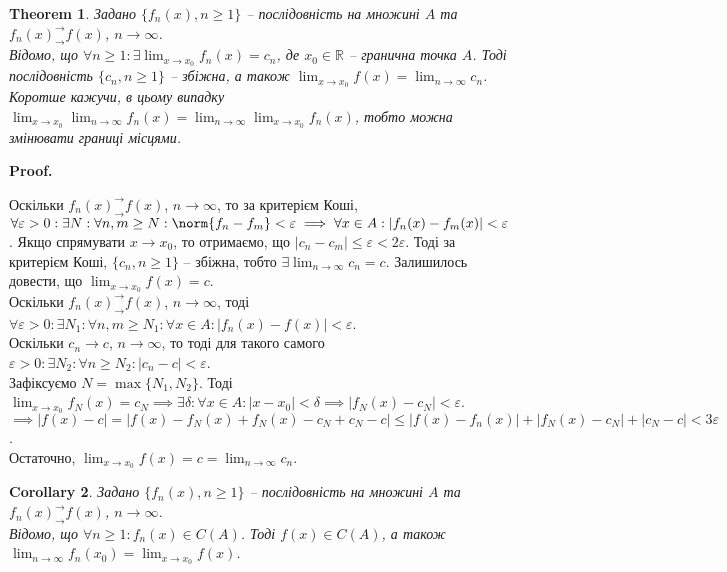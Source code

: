 \documentclass[a4paper, 10pt]{article}
\makeatletter
\def\huge{\displaystyle}
\def\qed{$\blacksquare$}
\theoremstyle{theoremdd}
\newtheorem{theorem}{Theorem}[subsection]
\theoremstyle{theoremdd}
\theoremstyle{theoremdd}
\theoremstyle{theoremdd}
\theoremstyle{theoremdd}
\theoremstyle{theoremdd}
\theoremstyle{theoremdd}
\theoremstyle{theoremdd}
\theoremstyle{theoremdd}
\newtheorem{corollary}[theorem]{Corollary}
\renewenvironment{proof}[1][Proof.\\]{\par
\pushQED{\hfill \qed}%
\normalfont \topsep6\p@\@plus6\p@\relax
\trivlist
\item\relax
{\bfseries
#1\@addpunct{.}}\hspace\labelsep\ignorespaces
}{%
\popQED\endtrivlist\@endpefalse
}
\makeatother
\begin{document}
\begin{theorem}
Задано $\{f_n(x), n \geq 1\}$ -- послідовність на множині $A$ та $f_n(x)^\rightarrow_\rightarrow f(x)$, $n \to \infty$.\\
Відомо, що $\forall n \geq 1: \exists\huge\lim_{x \to x_0} f_n(x) = c_n$, де $x_0 \in \mathbb{R}$ -- гранична точка $A$. Тоді послідовність $\{c_n, n \geq 1\}$ -- збіжна, а також $\huge\lim_{x \to x_0} f(x) = \lim_{n \to \infty} c_n$.\\
Коротше кажучи, в цьому випадку $\displaystyle\lim_{x \to x_0} \lim_{n \to \infty} f_n(x) = \lim_{n \to \infty} \lim_{x \to x_0} f_n(x)$, тобто можна змінювати границі місцями.
\end{theorem}

\begin{proof}
Оскільки $f_n(x)^\rightarrow_\rightarrow f(x)$, $n \to \infty$, то за критерієм Коші,
$\forall \varepsilon > 0: \exists N: \forall n,m \geq N: \norm{f_n-f_m} < \varepsilon \implies \forall x \in A: |f_n(x) - f_m(x)| < \varepsilon$. Якщо спрямувати $x \to x_0$, то отримаємо, що $|c_n - c_m| \leq \varepsilon < 2 \varepsilon$. Тоді за критерієм Коші, $\{c_n, n \geq 1\}$ -- збіжна, тобто $\exists \huge\lim_{n \to \infty} c_n = c$. Залишилось довести, що $\huge\lim_{x \to x_0} f(x) = c$.\\
Оскільки $f_n(x)^\rightarrow_\rightarrow f(x)$, $n \to \infty$, тоді $\forall \varepsilon > 0: \exists N_1: \forall n,m \geq N_1: \forall x \in A: |f_n(x) - f(x)| < \varepsilon$.\\
Оскільки $c_n \to c$, $n \to \infty$, то тоді для такого самого $\varepsilon > 0: \exists N_2: \forall n \geq N_2: |c_n - c| < \varepsilon$.\\
Зафіксуємо $N = \max \{N_1,N_2\}$. Тоді $\huge\lim_{x \to x_0} f_N(x) = c_N \implies \exists \delta: \forall x \in A: |x-x_0| < \delta \implies |f_N(x) - c_N| < \varepsilon$.\\
$\implies |f(x) - c| = |f(x) - f_N(x) + f_N(x) - c_N + c_N - c| \leq |f(x) - f_n(x)| + |f_N(x) - c_N| + |c_N-c| < 3 \varepsilon$.\\
Остаточно, $\huge\lim_{x \to x_0} f(x) = c = \lim_{n \to \infty} c_n$.
\end{proof}

\begin{corollary}
Задано $\{f_n(x), n \geq 1\}$ -- послідовність на множині $A$ та $f_n(x)^\rightarrow_\rightarrow f(x)$, $n \to \infty$.\\
Відомо, що $\forall n \geq 1: f_n(x) \in C(A)$. Тоді $f(x) \in C(A)$, а також $\huge\lim_{n \to \infty} f_n(x_0) = \lim_{x \to x_0} f(x)$.
\end{corollary}
\end{document}
